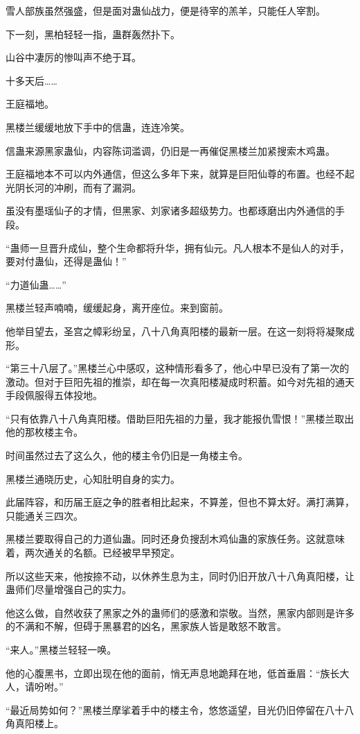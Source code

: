 \begin{this_body}
雪人部族虽然强盛，但是面对蛊仙战力，便是待宰的羔羊，只能任人宰割。

下一刻，黑柏轻轻一指，蛊群轰然扑下。

山谷中凄厉的惨叫声不绝于耳。

十多天后……

王庭福地。

黑楼兰缓缓地放下手中的信蛊，连连冷笑。

信蛊来源黑家蛊仙，内容陈词滥调，仍旧是一再催促黑楼兰加紧搜索木鸡蛊。

王庭福地本不可以内外通信，但这么多年下来，就算是巨阳仙尊的布置。也经不起光阴长河的冲刷，而有了漏洞。

虽没有墨瑶仙子的才情，但黑家、刘家诸多超级势力。也都琢磨出内外通信的手段。

“蛊师一旦晋升成仙，整个生命都将升华，拥有仙元。凡人根本不是仙人的对手，要对付蛊仙，还得是蛊仙！”

“力道仙蛊……”

黑楼兰轻声喃喃，缓缓起身，离开座位。来到窗前。

他举目望去，圣宫之幛彩纷呈，八十八角真阳楼的最新一层。在这一刻将将凝聚成形。

“第三十八层了。”黑楼兰心中感叹，这种情形看多了，他心中早已没有了第一次的激动。但对于巨阳先祖的推崇，却在每一次真阳楼凝成时积蓄。如今对先祖的通天手段佩服得五体投地。

“只有依靠八十八角真阳楼。借助巨阳先祖的力量，我才能报仇雪恨！”黑楼兰取出他的那枚楼主令。

时间虽然过去了这么久，他的楼主令仍旧是一角楼主令。

黑楼兰通晓历史，心知肚明自身的实力。

此届阵容，和历届王庭之争的胜者相比起来，不算差，但也不算太好。满打满算，只能通关三四次。

黑楼兰要取得自己的力道仙蛊。同时还身负搜刮木鸡仙蛊的家族任务。这就意味着，两次通关的名额。已经被早早预定。

所以这些天来，他按捺不动，以休养生息为主，同时仍旧开放八十八角真阳楼，让蛊师们尽量增强自己的实力。

他这么做，自然收获了黑家之外的蛊师们的感激和崇敬。当然，黑家内部则是许多的不满和不解，但碍于黑暴君的凶名，黑家族人皆是敢怒不敢言。

“来人。”黑楼兰轻轻一唤。

他的心腹黑书，立即出现在他的面前，悄无声息地跪拜在地，低首垂眉：“族长大人，请吩咐。”

“最近局势如何？”黑楼兰摩挲着手中的楼主令，悠悠遥望，目光仍旧停留在八十八角真阳楼上。


\end{this_body}
